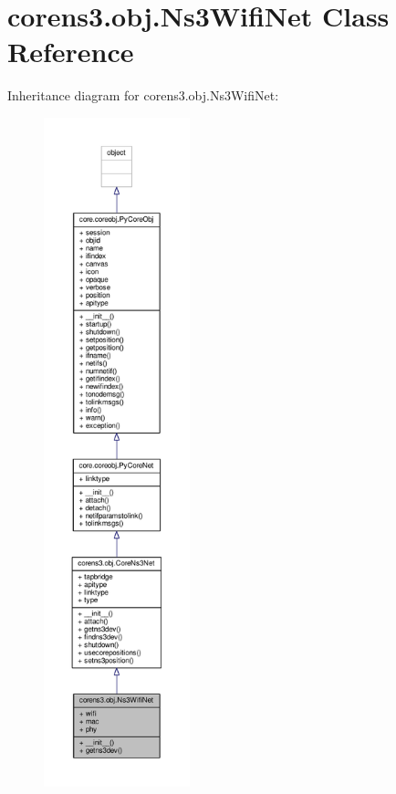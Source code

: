 \hypertarget{classcorens3_1_1obj_1_1_ns3_wifi_net}{\section{corens3.\+obj.\+Ns3\+Wifi\+Net Class Reference}
\label{classcorens3_1_1obj_1_1_ns3_wifi_net}
}


Inheritance diagram for corens3.\+obj.\+Ns3\+Wifi\+Net\+:
\nopagebreak
\begin{figure}[H]
\begin{center}
\leavevmode
\includegraphics[height=550pt]{classcorens3_1_1obj_1_1_ns3_wifi_net__inherit__graph}
\end{center}
\end{figure}


